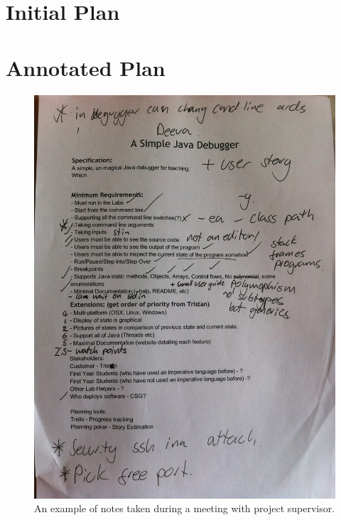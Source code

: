 \documentclass[11pt, a4paper]{article}
\begin{document}
\appendix
\section{Initial Plan}
\label{sec:initialplan}


\section{Annotated Plan}
\begin{figure}[h!]
\centering
\includegraphics[width=\textwidth]{annotatedreport.jpg}
\caption{An example of notes taken during a meeting with project supervisor.}
\end{figure}
\end{document}
